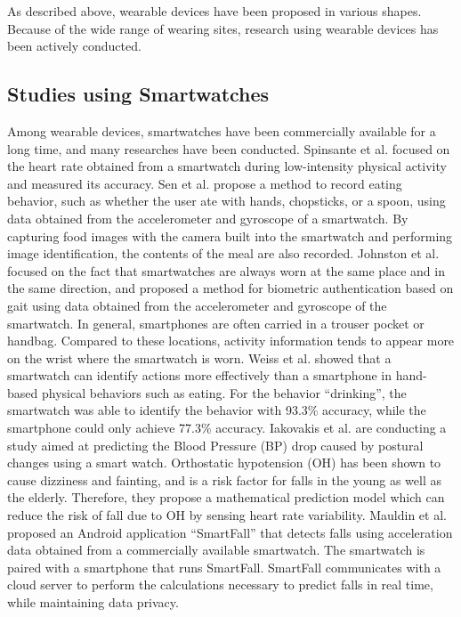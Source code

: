 \documentclass[sigchi,authordraft]{acmart}
\begin{document}
As described above, wearable devices have been proposed in various shapes. Because of the wide range of wearing sites, research using wearable devices has been actively conducted.


\subsection{Studies using Smartwatches}
Among wearable devices, smartwatches have been commercially available for a long time, and many researches have been conducted.
Spinsante et al. \cite{accuracy_in_low_intensity} focused on the heart rate obtained from a smartwatch during low-intensity physical activity and measured its accuracy.
Sen et al. \cite{eating_recognition} propose a method to record eating behavior, such as whether the user ate with hands, chopsticks, or a spoon, using data obtained from the accelerometer and gyroscope of a smartwatch. By capturing food images with the camera built into the smartwatch and performing image identification, the contents of the meal are also recorded.
Johnston et al. \cite{smartwatch_walk_authentication} focused on the fact that smartwatches are always worn at the same place and in the same direction, and proposed a method for biometric authentication based on gait using data obtained from the accelerometer and gyroscope of the smartwatch. In general, smartphones are often carried in a trouser pocket or handbag. Compared to these locations, activity information tends to appear more on the wrist where the smartwatch is worn.
Weiss et al. \cite{smartwatch_activity_recognition} showed that a smartwatch can identify actions more effectively than a smartphone in hand-based physical behaviors such as eating. For the behavior ``drinking'', the smartwatch was able to identify the behavior with 93.3\% accuracy, while the smartphone could only achieve 77.3\% accuracy.
Iakovakis et al. \cite{oh_detection} are conducting a study aimed at predicting the Blood Pressure (BP) drop caused by postural changes using a smart watch. Orthostatic hypotension (OH) has been shown to cause dizziness and fainting, and is a risk factor for falls in the young as well as the elderly. Therefore, they propose a mathematical prediction model which can reduce the risk of fall due to OH by sensing heart rate variability.
Mauldin et al. \cite{smartfall} proposed an Android application ``SmartFall'' that detects falls using acceleration data obtained from a commercially available smartwatch. The smartwatch is paired with a smartphone that runs SmartFall. SmartFall communicates with a cloud server to perform the calculations necessary to predict falls in real time, while maintaining data privacy.
\end{document}
